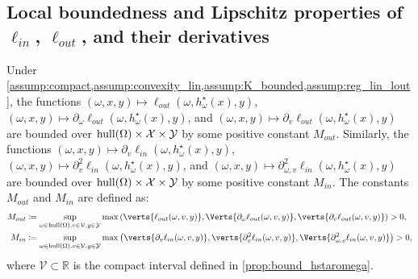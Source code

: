 \subsection{{Local boundedness and Lipschitz  properties of $\ell_{in}$, $\ell_{out}$, and their derivatives }}

\begin{proposition}\label{prop:uniform_boundedness}
Under \cref{assump:compact,assump:convexity_lin,assump:K_bounded,assump:reg_lin_lout}, the functions $(\omega,x,y)\mapsto \ell_{out}(\omega,h_{\omega}^{\star}(x),y)$, $(\omega,x,y)\mapsto \partial_{\omega}\ell_{out}(\omega,h_{\omega}^{\star}(x),y)$, and $(\omega,x,y)\mapsto\partial_v \ell_{out}(\omega, h^\star_\omega(x), y)$ are bounded over $\textnormal{hull}(\Omega)\times\mathcal{X}\times\mathcal{Y}$ by some positive constant $M_{out}$. Similarly, the functions $(\omega,x,y)\mapsto\partial_v \ell_{in}(\omega, h^\star_\omega(x), y)$, $(\omega,x,y)\mapsto\partial_v^2 \ell_{in}(\omega, h^\star_\omega(x), y)$, and $(\omega,x,y)\mapsto\partial_{\omega, v}^2 \ell_{in}(\omega, h^\star_\omega(x), y)$  are bounded over $\textnormal{hull}(\Omega)\times\mathcal{X}\times\mathcal{Y}$ by some positive constant $M_{in}$. 
The constants $M_{out}$ and $M_{in}$ are defined as:
\begin{align*}
M_{out}&\coloneqq\sup_{\omega\in\textnormal{hull}(\Omega),v\in\mathcal{V},y\in\mathcal{Y}}\max\left(\verts{\ell_{out}(\omega,v,y)},\Verts{\partial_{\omega}\ell_{out}(\omega,v,y)},\verts{\partial_v\ell_{out}(\omega, v, y)}\right)>0,\\
M_{in}&\coloneqq\sup_{\omega\in\textnormal{hull}(\Omega),v\in\mathcal{V},y\in\mathcal{Y}}\max\left(\verts{\partial_v\ell_{in}(\omega, v, y)}, \verts{\partial_v^2\ell_{in}(\omega, v, y)},\Verts{\partial_{\omega, v}^2\ell_{in}(\omega, v, y)}\right)>0,
\end{align*}
where $\mathcal{V}\subset\mathbb{R}$ is the compact interval defined in \cref{prop:bound_hstaromega}.
\end{proposition}

